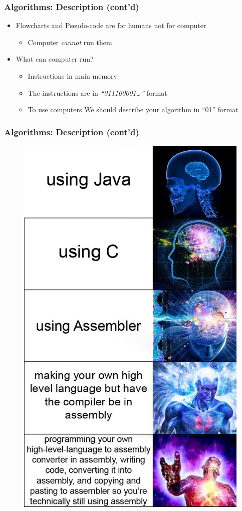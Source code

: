 \documentclass{../c-lecture}
\begin{document}
\begin{frame}
  \frametitle{Algorithms: Description (cont’d)}
  \begin{itemize}
    \item Flowcharts and Pseudo-code are for humans not for computer
    \begin{itemize}
      \item Computer \textit{\color{Orange} cannot} run them
    \end{itemize}
    \item What can computer run?
    \begin{itemize}
      \item Instructions in main memory
      \item
        The instructions are in
        \textit{\color{Cyan} ``011100001\ldots''} format
      \item
        To use computers \textmd{We should describe your algorithm in “01” format}
    \end{itemize}
  \end{itemize}
\end{frame}

\begin{frame}
  \frametitle{Algorithms: Description (cont’d)}
  \begin{figure}
    \includegraphics[width=.35\textwidth]{./img/assembly.jpg}
  \end{figure}
\end{frame}
\end{document}

